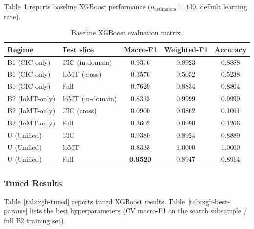 Table~\ref{tab:xgb-baseline} reports baseline XGBoost performance ($n_{\text{estimators}}=100$, default learning rate).

\begin{table}[H]
\centering
\caption{Baseline XGBoost evaluation matrix.}
\label{tab:xgb-baseline}
\small
\begin{tabular}{@{}l l c c c@{}}
\toprule
\textbf{Regime} & \textbf{Test slice} & \textbf{Macro-F1} & \textbf{Weighted-F1} & \textbf{Accuracy} \\
\midrule
B1 (CIC-only) & CIC (in-domain)  & 0.9376 & 0.8923 & 0.8888 \\
B1 (CIC-only) & IoMT (cross)     & 0.3576 & 0.5052 & 0.5238 \\
B1 (CIC-only) & Full             & 0.7629 & 0.8834 & 0.8804 \\
\midrule
B2 (IoMT-only) & IoMT (in-domain) & 0.8333 & 0.9999 & 0.9999 \\
B2 (IoMT-only) & CIC (cross)      & 0.0900 & 0.0862 & 0.1061 \\
B2 (IoMT-only) & Full             & 0.3602 & 0.0990 & 0.1266 \\
\midrule
U (Unified)    & CIC              & 0.9380 & 0.8924 & 0.8889 \\
U (Unified)    & IoMT             & 0.8333 & 1.0000 & 1.0000 \\
U (Unified)    & Full             & \textbf{0.9520} & 0.8947 & 0.8914 \\
\bottomrule
\end{tabular}
\end{table}

\subsubsection{Tuned Results}

Table~\ref{tab:xgb-tuned} reports tuned XGBoost results. Table~\ref{tab:xgb-best-params} lists the best hyperparameters (CV macro-F1 on the search subsample / full B2 training set).

